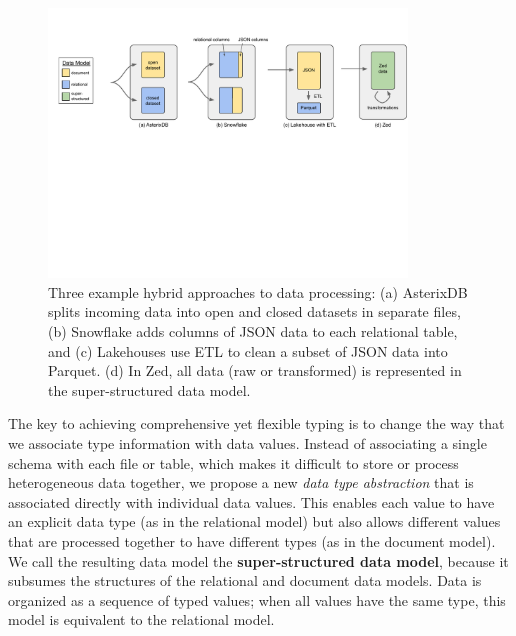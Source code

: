 \begin{figure}[t]
    \centering
    \includegraphics[width=0.85\textwidth]{figures/hybrid_approaches.pdf}
    \vspace{-1em}
    \caption{Three example hybrid approaches to data processing: (a) AsterixDB splits incoming data into open and closed datasets in separate files, (b) Snowflake adds columns of JSON data to each relational table, and (c) Lakehouses use ETL to clean a subset of JSON data into Parquet. (d) In Zed, all data (raw or transformed) is represented in the super-structured data model.}
    \label{f:hybrid_approaches}
    \vspace{-1em}
\end{figure}

The key to achieving comprehensive yet flexible typing is to change the way that we associate type information with data values. Instead of associating a single schema with each file or table, which makes it difficult to store or process heterogeneous data together, we propose a new {\em data type abstraction} that is associated directly with individual data values. This enables each value to have an explicit data type (as in the relational model) but also allows different values that are processed together to have different types (as in the document model). We call the resulting data model the {\bf super-structured data model}, because it subsumes the structures of the relational and document data models. Data is organized as a sequence of typed values; when all values have the same type, this model is equivalent to the relational model.


